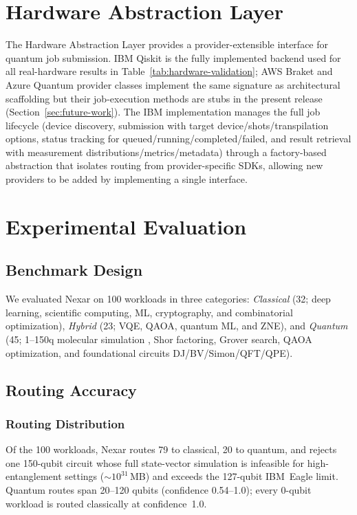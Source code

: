 \documentclass[10pt,conference]{IEEEtran}
\begin{document}
\section{Hardware Abstraction Layer}\label{sec:hardware-abstraction}

The Hardware Abstraction Layer provides a provider-extensible interface for quantum job submission. IBM Qiskit is the fully implemented backend used for all real-hardware results in Table~\ref{tab:hardware-validation}; AWS Braket and Azure Quantum provider classes implement the same signature as architectural scaffolding but their job-execution methods are stubs in the present release (Section~\ref{sec:future-work}). The IBM implementation manages the full job lifecycle (device discovery, submission with target device/shots/transpilation options, status tracking for queued/running/completed/failed, and result retrieval with measurement distributions/metrics/metadata) through a factory-based abstraction that isolates routing from provider-specific SDKs, allowing new providers to be added by implementing a single interface.

\section{Experimental Evaluation}

\subsection{Benchmark Design}

We evaluated Nexar on 100 workloads in three categories: \emph{Classical} (32; deep learning, scientific computing, ML, cryptography, and combinatorial optimization), \emph{Hybrid} (23; VQE, QAOA, quantum ML, and ZNE), and \emph{Quantum} (45; 1--150q molecular simulation \cite{kandala2017}, Shor factoring, Grover search, QAOA optimization, and foundational circuits DJ/BV/Simon/QFT/QPE).

\subsection{Routing Accuracy}\label{sec:routing-accuracy}

\subsubsection{Routing Distribution}
Of the 100 workloads, Nexar routes 79 to classical, 20 to quantum, and rejects one 150-qubit circuit whose full state-vector simulation is infeasible for high-entanglement settings ($\sim\!10^{31}$\,MB) and exceeds the 127-qubit IBM~Eagle limit. Quantum routes span 20--120 qubits (confidence 0.54--1.0); every 0-qubit workload is routed classically at confidence~1.0.
\end{document}

